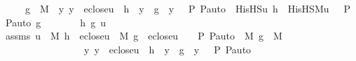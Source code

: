 \begin{isabellebody}
\ \ \ \ \ g\ {\isasymin}\ M\ {\isasymLongrightarrow}\ {\isacharparenleft}{\kern0pt}{\isasymAnd}y{\isachardot}{\kern0pt}\ y\ {\isasymin}\ eclose{\isacharparenleft}{\kern0pt}u{\isacharparenright}{\kern0pt}\ {\isasymLongrightarrow}\ h\ {\isacharbackquote}{\kern0pt}\ y\ {\isacharequal}{\kern0pt}\ g\ {\isacharbackquote}{\kern0pt}\ {\isasymlangle}y{\isacharcomma}{\kern0pt}\ {\isasymF}{\isacharcomma}{\kern0pt}\ {\isasymG}{\isacharcomma}{\kern0pt}\ P{\isacharcomma}{\kern0pt}\ P{\isacharunderscore}{\kern0pt}auto{\isasymrangle}{\isacharparenright}{\kern0pt}\ {\isasymLongrightarrow}\ His{\isacharunderscore}{\kern0pt}HS{\isacharparenleft}{\kern0pt}u{\isacharcomma}{\kern0pt}\ h{\isacharparenright}{\kern0pt}\ {\isacharequal}{\kern0pt}\ His{\isacharunderscore}{\kern0pt}HS{\isacharunderscore}{\kern0pt}M{\isacharparenleft}{\kern0pt}{\isasymlangle}u{\isacharcomma}{\kern0pt}\ {\isasymF}{\isacharcomma}{\kern0pt}\ {\isasymG}{\isacharcomma}{\kern0pt}\ P{\isacharcomma}{\kern0pt}\ P{\isacharunderscore}{\kern0pt}auto{\isasymrangle}{\isacharcomma}{\kern0pt}\ g{\isacharparenright}{\kern0pt}{\isachardoublequoteclose}\ \isanewline
%
\isadelimproof
%
\endisadelimproof
%
\isatagproof
{}\isamarkupfalse%
\ {\isacharminus}{\kern0pt}\ \isanewline
\ \ \isamarkupfalse%
\ h\ g\ u\isanewline
\ \ \isamarkupfalse%
\ assms{\isacharcolon}{\kern0pt}\ {\isachardoublequoteopen}u\ {\isasymin}\ M{\isachardoublequoteclose}\ {\isachardoublequoteopen}h\ {\isasymin}\ eclose{\isacharparenleft}{\kern0pt}u{\isacharparenright}{\kern0pt}\ {\isasymrightarrow}\ M{\isachardoublequoteclose}\ {\isachardoublequoteopen}g\ {\isasymin}\ eclose{\isacharparenleft}{\kern0pt}u{\isacharparenright}{\kern0pt}\ {\isasymtimes}\ {\isacharbraceleft}{\kern0pt}{\isacharless}{\kern0pt}{\isasymF}{\isacharcomma}{\kern0pt}\ {\isasymG}{\isacharcomma}{\kern0pt}\ P{\isacharcomma}{\kern0pt}\ P{\isacharunderscore}{\kern0pt}auto{\isachargreater}{\kern0pt}{\isacharbraceright}{\kern0pt}\ {\isasymrightarrow}\ M{\isachardoublequoteclose}\ {\isachardoublequoteopen}g\ {\isasymin}\ M{\isachardoublequoteclose}\ \isanewline
\ \ \ \ \ \ \ \ \ \ \ \ \ \ \ \ \ {\isachardoublequoteopen}{\isacharparenleft}{\kern0pt}{\isasymAnd}y{\isachardot}{\kern0pt}\ y\ {\isasymin}\ eclose{\isacharparenleft}{\kern0pt}u{\isacharparenright}{\kern0pt}\ {\isasymLongrightarrow}\ h\ {\isacharbackquote}{\kern0pt}\ y\ {\isacharequal}{\kern0pt}\ g\ {\isacharbackquote}{\kern0pt}\ {\isasymlangle}y{\isacharcomma}{\kern0pt}\ {\isasymF}{\isacharcomma}{\kern0pt}\ {\isasymG}{\isacharcomma}{\kern0pt}\ P{\isacharcomma}{\kern0pt}\ P{\isacharunderscore}{\kern0pt}auto{\isasymrangle}{\isacharparenright}{\kern0pt}{\isachardoublequoteclose}\ \isanewline

\end{isabellebody}
